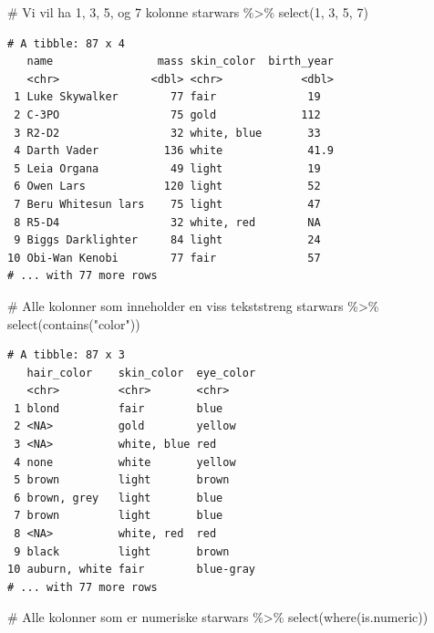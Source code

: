 \documentclass[
  letterpaper,
  DIV=11,
  numbers=noendperiod]{scrreprt}
\newenvironment{Shaded}{\begin{snugshade}}{\end{snugshade}}
\newcommand{\CommentTok}[1]{\textcolor[rgb]{0.37,0.37,0.37}{#1}}
\newcommand{\DecValTok}[1]{\textcolor[rgb]{0.68,0.00,0.00}{#1}}
\newcommand{\FunctionTok}[1]{\textcolor[rgb]{0.28,0.35,0.67}{#1}}
\newcommand{\NormalTok}[1]{\textcolor[rgb]{0.00,0.23,0.31}{#1}}
\newcommand{\SpecialCharTok}[1]{\textcolor[rgb]{0.37,0.37,0.37}{#1}}
\newcommand{\StringTok}[1]{\textcolor[rgb]{0.13,0.47,0.30}{#1}}
\begin{document}
\begin{Shaded}
\begin{Highlighting}[]
\CommentTok{\# Vi vil ha 1, 3, 5, og 7 kolonne}
\NormalTok{starwars }\SpecialCharTok{\%\textgreater{}\%} \FunctionTok{select}\NormalTok{(}\DecValTok{1}\NormalTok{, }\DecValTok{3}\NormalTok{, }\DecValTok{5}\NormalTok{, }\DecValTok{7}\NormalTok{)}
\end{Highlighting}
\end{Shaded}

\begin{verbatim}
# A tibble: 87 x 4
   name                mass skin_color  birth_year
   <chr>              <dbl> <chr>            <dbl>
 1 Luke Skywalker        77 fair              19  
 2 C-3PO                 75 gold             112  
 3 R2-D2                 32 white, blue       33  
 4 Darth Vader          136 white             41.9
 5 Leia Organa           49 light             19  
 6 Owen Lars            120 light             52  
 7 Beru Whitesun lars    75 light             47  
 8 R5-D4                 32 white, red        NA  
 9 Biggs Darklighter     84 light             24  
10 Obi-Wan Kenobi        77 fair              57  
# ... with 77 more rows
\end{verbatim}

\begin{Shaded}
\begin{Highlighting}[]
\CommentTok{\# Alle kolonner som inneholder en viss tekststreng}
\NormalTok{starwars }\SpecialCharTok{\%\textgreater{}\%} \FunctionTok{select}\NormalTok{(}\FunctionTok{contains}\NormalTok{(}\StringTok{"color"}\NormalTok{))}
\end{Highlighting}
\end{Shaded}

\begin{verbatim}
# A tibble: 87 x 3
   hair_color    skin_color  eye_color
   <chr>         <chr>       <chr>    
 1 blond         fair        blue     
 2 <NA>          gold        yellow   
 3 <NA>          white, blue red      
 4 none          white       yellow   
 5 brown         light       brown    
 6 brown, grey   light       blue     
 7 brown         light       blue     
 8 <NA>          white, red  red      
 9 black         light       brown    
10 auburn, white fair        blue-gray
# ... with 77 more rows
\end{verbatim}

\begin{Shaded}
\begin{Highlighting}[]
\CommentTok{\# Alle kolonner som er numeriske}
\NormalTok{starwars }\SpecialCharTok{\%\textgreater{}\%} \FunctionTok{select}\NormalTok{(}\FunctionTok{where}\NormalTok{(is.numeric))}
\end{Highlighting}
\end{Shaded}
\end{document}
